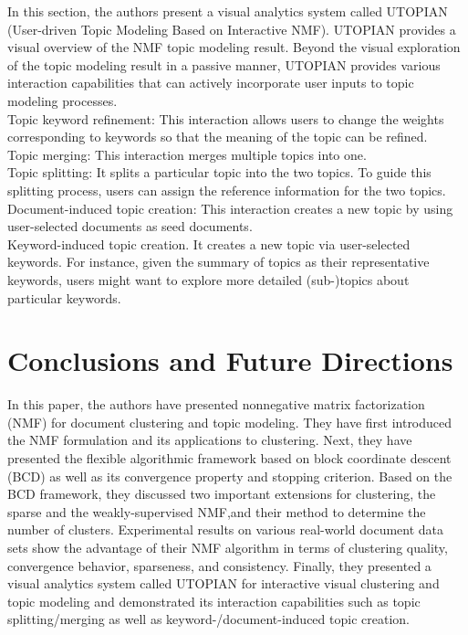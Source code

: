 \documentclass[11pt, oneside]{article}   	%
\begin{document}
In this section, the authors present a visual analytics system called UTOPIAN (User-driven Topic Modeling Based on Interactive NMF). UTOPIAN provides a visual overview of the NMF topic modeling result. Beyond the visual exploration of the topic modeling result in a passive manner, UTOPIAN provides various interaction capabilities that can actively incorporate user inputs to topic modeling processes.\\
Topic keyword refinement: This interaction allows users to change the weights corresponding to keywords so that the meaning of the topic can be refined.\\
Topic merging: This interaction merges multiple topics into one.\\
Topic splitting: It splits a particular topic into the two topics. To guide this splitting process, users can assign the reference information for the two topics.\\
Document-induced topic creation: This interaction creates a new topic by using user-selected documents as seed documents.\\
Keyword-induced topic creation. It creates a new topic via user-selected keywords. For instance, given the summary of topics as their representative keywords, users might want to explore more detailed (sub-)topics about particular keywords.

\section{Conclusions and Future Directions}
In this paper, the authors have presented nonnegative matrix factorization (NMF) for document clustering and topic modeling. They have first introduced the NMF formulation and its applications to clustering. Next, they have presented the flexible algorithmic framework based on block coordinate descent (BCD) as well as its convergence property and stopping criterion. Based on the BCD framework, they discussed two important extensions for clustering, the sparse and the weakly-supervised NMF,and their method to determine the number of clusters. Experimental results on various real-world document data sets show the advantage of their NMF algorithm in terms of clustering quality, convergence behavior, sparseness, and consistency. Finally, they presented a visual analytics system called UTOPIAN for interactive visual clustering and topic modeling and demonstrated its interaction capabilities such as topic splitting/merging as well as keyword-/document-induced topic creation.
\end{document}
